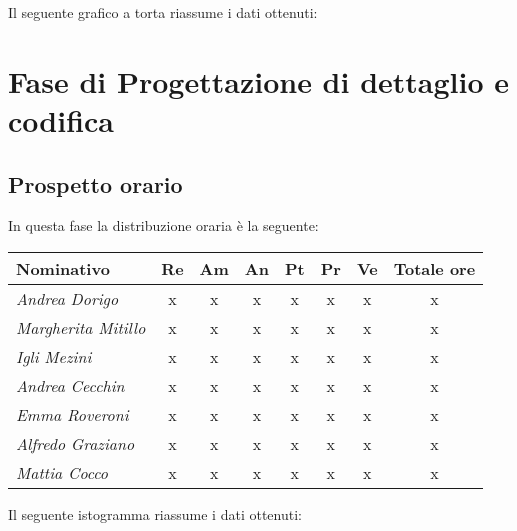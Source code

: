{{{{{{Il seguente grafico a torta riassume i dati ottenuti:

\section{Fase di Progettazione di dettaglio e codifica}\label{5.4}

\subsection{Prospetto orario}\label{5.4.1}
In questa fase la distribuzione oraria è la seguente:
\quad
\def\tabularxcolumn#1{m{#1}}
{
	
	\begin{center}
		\renewcommand{\arraystretch}{1.4}
		\begin{tabularx}{\textwidth}{|X|c|c|c|c|c|c|c|}
			\hline
			\rowcolor{airforceblue}
			\textbf{Nominativo} & \textbf{Re} & \textbf{Am} & \textbf{An} & \textbf{Pt} & \textbf{Pr} & \textbf{Ve} & \textbf{Totale ore}\\
			\hline
			\textit{Andrea Dorigo} & x & x & x & x & x & x & x\\
			\hline
			\textit{Margherita Mitillo} & x & x & x & x & x & x & x\\
			\hline
			\textit{Igli Mezini} & x & x & x & x & x & x & x\\
			\hline
			\textit{Andrea Cecchin} & x & x & x & x & x & x & x\\
			\hline
			\textit{Emma Roveroni} & x & x & x & x & x & x & x\\
			\hline
			\textit{Alfredo Graziano} & x & x & x & x & x & x & x\\
			\hline
			\textit{Mattia Cocco} & x & x & x & x & x & x & x\\
			\hline
		\end{tabularx}
	\end{center}

Il seguente istogramma riassume i dati ottenuti:

}}}}}}}
